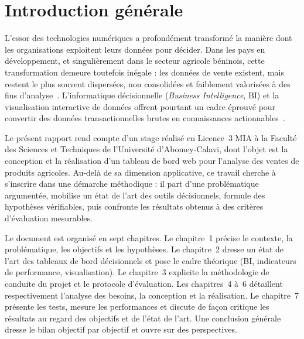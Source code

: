 \documentclass[11pt,a4paper]{report}
\begin{document}
\cleardoublepage
{}

\chapter*{Introduction générale}

L'essor des technologies numériques a profondément transformé la manière dont
les organisations exploitent leurs données pour décider. Dans les pays en
développement, et singulièrement dans le secteur agricole béninois, cette
transformation demeure toutefois inégale : les données de vente existent, mais
restent le plus souvent dispersées, non consolidées et faiblement valorisées à
des fins d'analyse~\cite{fao2021digital,worldbank2020}. L'informatique
décisionnelle (\emph{Business Intelligence}, BI) et la visualisation
interactive de données offrent pourtant un cadre éprouvé pour convertir des
données transactionnelles brutes en connaissances actionnables~\cite{chen2012bi,
few2006dashboard}.

Le présent rapport rend compte d'un stage réalisé en Licence~3 MIA à la Faculté
des Sciences et Techniques de l'Université d'Abomey-Calavi, dont l'objet est la
conception et la réalisation d'un tableau de bord web pour l'analyse des ventes
de produits agricoles. Au-delà de sa dimension applicative, ce travail cherche
à s'inscrire dans une démarche méthodique : il part d'une problématique
argumentée, mobilise un état de l'art des outils décisionnels, formule des
hypothèses vérifiables, puis confronte les résultats obtenus à des critères
d'évaluation mesurables.

Le document est organisé en sept chapitres. Le chapitre~1 précise le contexte,
la problématique, les objectifs et les hypothèses. Le chapitre~2 dresse un état
de l'art des tableaux de bord décisionnels et pose le cadre théorique
(BI, indicateurs de performance, visualisation). Le chapitre~3 explicite la
méthodologie de conduite du projet et le protocole d'évaluation. Les
chapitres~4 à~6 détaillent respectivement l'analyse des besoins, la conception
et la réalisation. Le chapitre~7 présente les tests, mesure les performances et
discute de façon critique les résultats au regard des objectifs et de l'état de
l'art. Une conclusion générale dresse le bilan objectif par objectif et ouvre
sur des perspectives.
\end{document}
